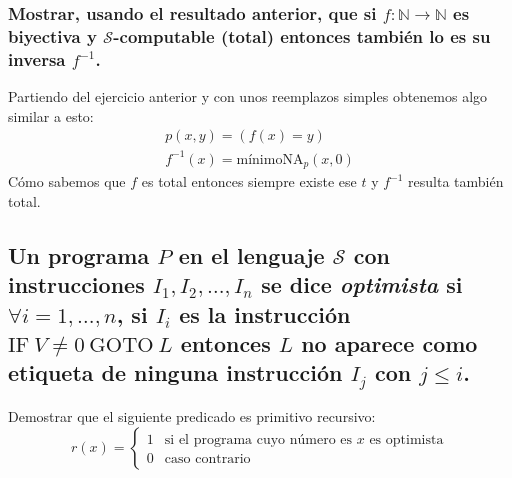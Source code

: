 \documentclass[fleqn, 11pt]{article}
\newcommand{\nat}{\mathbb{N}}
\newcommand{\Scur}{\mathcal{S}}
\newcommand{\IF}{\text{IF}}
\newcommand{\GOTO}{\text{GOTO}}
\begin{document}
\subsubsection{Mostrar, usando el resultado anterior, que si
$f : \nat \to \nat$ es biyectiva y $\Scur$-computable (total) entonces también
lo es su inversa $f^{-1}$.}

Partiendo del ejercicio anterior y con unos reemplazos simples obtenemos algo
similar a esto:
\begin{gather*}
	p(x, y) = (f(x) = y) \\
	f^{-1}(x) = \text{mínimoNA}_p(x, 0)
\end{gather*}
Cómo sabemos que $f$ es total entonces siempre existe ese $t$ y $f^{-1}$
resulta también total.

\subsection{Un programa $P$ en el lenguaje $\Scur$ con instrucciones $I_1, I_2,
\dots, I_n$ se dice \emph{optimista} si $\forall i = 1, \dots, n$, si $I_i$ es
la instrucción $\IF\ V \neq 0\ \GOTO\ L$ entonces $L$ no aparece como etiqueta
de ninguna instrucción $I_j$ con $j \leq i$.}

Demostrar que el siguiente predicado es primitivo recursivo:
\[
	r(x) =
	\begin{cases}
		1 & \text{si el programa cuyo número es $x$ es optimista} \\
		0 & \text{caso contrario}
	\end{cases}
\]
\end{document}
